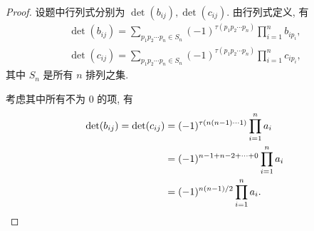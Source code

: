 \begin{proof}
    设题中行列式分别为 \(\det(b_{ij}),\det(c_{ij})\). 由行列式定义, 有
    \begin{gather*}
        \det(b_{ij})=\sum_{p_1p_2\cdots p_n\in S_n}(-1)^{\tau(p_1p_2\cdots p_n)}\prod_{i=1}^{n}b_{ip_i},\\
        \det(c_{ij})=\sum_{p_1p_2\cdots p_n\in S_n}(-1)^{\tau(p_1p_2\cdots p_n)}\prod_{i=1}^{n}c_{ip_i},
    \end{gather*}
    其中 \(S_n\) 是所有 \(n\) 排列之集.

    考虑其中所有不为 \(0\) 的项, 有
    \begin{align*}
        \det(b_{ij})=\det(c_{ij})&=(-1)^{\tau(n(n-1)\cdots1)}\prod_{i=1}^{n}a_i\\
        &=(-1)^{n-1+n-2+\cdots+0}\prod_{i=1}^{n}a_i\\
        &=(-1)^{n(n-1)/2}\prod_{i=1}^{n}a_i.\qedhere
    \end{align*}
\end{proof}